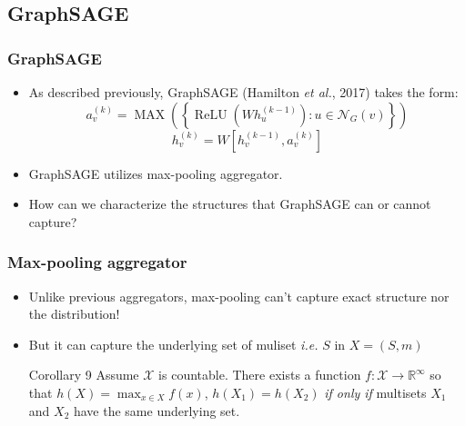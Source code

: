 \documentclass{beamer}
\DeclareMathOperator{\MAX}{MAX}
\DeclareMathOperator{\relu}{ReLU}
\begin{document}


\subsection{GraphSAGE}

\begin{frame}
\frametitle{GraphSAGE}

\begin{itemize}
	\item As described previously, GraphSAGE (Hamilton {\it et al.}, 2017) takes the form:
	$$a_v^{(k)} = \MAX \left( \left\{ \relu \left( W h_u^{(k - 1)} \right) : u \in \mathcal{N}_G(v) \right\} \right)$$
	$$h_v^{(k)} = W \left[ h_v^{(k - 1)}, a_v^{(k)} \right]$$ \pause
	
	\item GraphSAGE utilizes max-pooling aggregator. \pause
	
	\item How can we characterize the structures that GraphSAGE can or cannot capture?
\end{itemize}

\end{frame}

\begin{frame}
\frametitle{Max-pooling aggregator}

\begin{itemize}
	\item Unlike previous aggregators, max-pooling can't capture exact structure nor the distribution! \pause
	
	\item But it can capture the underlying set of muliset {\it i.e.} $S$ in $X = (S, m)$ \pause

\begin{block}{Corollary 9}
Assume $\mathcal{X}$ is countable.
There exists a function $f : \mathcal{X} \rightarrow \mathbb{R}^\infty$ so that $h(X) = \max_{x \in X} f(x)$, $h(X_1) = h(X_2)$ {\it if only if} multisets $X_1$ and $X_2$ have the same underlying set.

\end{block}

\end{itemize}
\end{frame}
\end{document}
